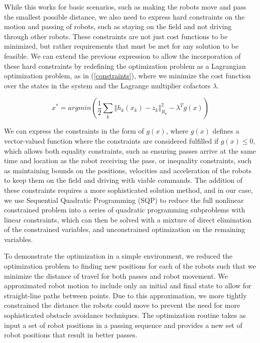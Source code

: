 \documentclass[a4paper, 10pt, conference]{ieeeconf}      %
\begin{document}
While this works for basic scenarios, such as making the robots move and pass the smallest possible distance, we also need to express hard constraints on the motion and passing of robots, such as staying on the field and not driving through other robots.  These constraints are not just cost functions to be minimized, but rather requirements that must be met for any solution to be feasible.  We can extend the previous expression to allow the incorporation of these hard constraints by redefining the optimization problem as a Lagrangian optimization problem, as in (\ref{constraints}), where we minimize the cost function over the states in the system and the Lagrange multiplier cofactors $\lambda$.

\begin{equation} \label{constraints}
x^{*} = argmin(\frac{1}{2}\sum_{k}\left\Vert h_{k}(x_{k})-z_{k}\right\Vert _{R_{k}}^{2}-\lambda^{T} g(x))
\end{equation} 

We can express the constraints in the form of $g(x)$, where $g(x)$ defines a vector-valued function where the constraints are considered fulfilled if $g(x)\leq 0$, which allows both equality constraints, such as ensuring passes arrive at the same time and location as the robot receiving the pass, or inequality constraints, such as maintaining bounds on the positions, velocities and acceleration of the robots to keep them on the field and driving with viable commands.  The addition of these constraints requires a more sophisticated solution method, and in our case, we use Sequential Quadratic Programming (SQP) to reduce the full nonlinear constrained problem into a series of quadratic programming subproblems with linear constraints, which can then be solved with a mixture of direct elimination of the constrained variables, and unconstrained optimization on the remaining variables\cite{Fletcher87book}. 

To demonstrate the optimization in a simple environment, we reduced the optimization problem to finding new positions for each of the robots such that we minimize the distance of travel for both passes and robot movement.  We approximated robot motion to include only an initial and final state to allow for straight-line paths between points.  Due to this approximation, we more tightly constrained the distance the robots could move to prevent the need for more sophisticated obstacle avoidance techniques.  The optimization routine takes as input a set of robot positions in a passing sequence and provides a new set of robot positions that result in better passes.  
\end{document}
